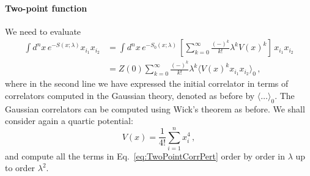 \documentclass[notes.tex]{subfiles}
\begin{document}
\paragraph{Two-point function}

We need to evaluate
\begin{align}
  \int d^nx\, e^{-S(x;\lambda)} x_{i_1} x_{i_2} &= 
  \int d^nx\, e^{-S_0(x;\lambda)}\, \left[\sum_{k=0}^\infty
  \frac{(-)^k}{k!} \lambda^k V(x)^k \right]\, x_{i_1} x_{i_2} \\
  \label{eq:TwoPointCorrPert}
                                               &=Z(0) \sum_{k=0}^\infty
  \frac{(-)^k}{k!} \lambda^k \langle V(x)^k x_{i_1} x_{i_2}\rangle_0\, ,
\end{align}
where in the second line we have expressed the initial correlator in
terms of correlators computed in the Gaussian theory, denoted as
before by $\langle \ldots \rangle_0$. The Gaussian correlators can be
computed using Wick's theorem as before. We shall consider again a
quartic potential:
\begin{equation}
  V(x) = \frac{1}{4!} \sum_{i=1}^n x_i^4\, ,
\end{equation}
and compute all the terms in Eq.~\ref{eq:TwoPointCorrPert} order by
order in $\lambda$ up to order $\lambda^2$.
\end{document}
